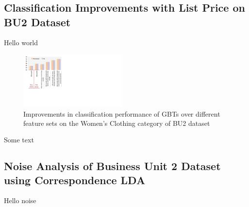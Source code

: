 \subsection{Classification Improvements with List Price on BU2 Dataset}
\label{Subsect:BU2-classification-improve-list-price}

Hello world
\begin{figure}
	\centering
	\includegraphics[width=0.48\textwidth]{images/BU2-gbt-feature-improvements}
	\caption{Improvements in classification performance of GBTs over different feature sets on the Women's Clothing category of BU2 dataset}
	\label{Figure_BU2-gbt-feature-improvements}
\end{figure}
Some text

\subsection{Noise Analysis of Business Unit 2 Dataset using Correspondence LDA}
\label{Subsect:BU2-noise-analysis}

\begin{figure}
	\vspace{-0.8cm}
	\centering
	\vspace{-0.3cm}
\end{figure}	
	
\begin{figure}
	\vspace{-0.8cm}
	\centering
	\vspace{-0.3cm}
\end{figure}
Hello noise



